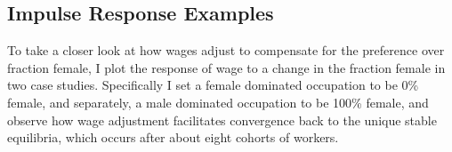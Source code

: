 \documentclass[12pt]{article}
\begin{document}

	


	



\subsection{Impulse Response Examples}
To take a closer look at how wages adjust to compensate for the preference over fraction female, I plot the response of wage to a change in the fraction female in two case studies. Specifically I set a female dominated occupation to be 0\% female, and separately, a male dominated occupation to be 100\% female, and observe how wage adjustment facilitates convergence back to the unique stable equilibria, which occurs after about eight cohorts of workers.

\end{document}
